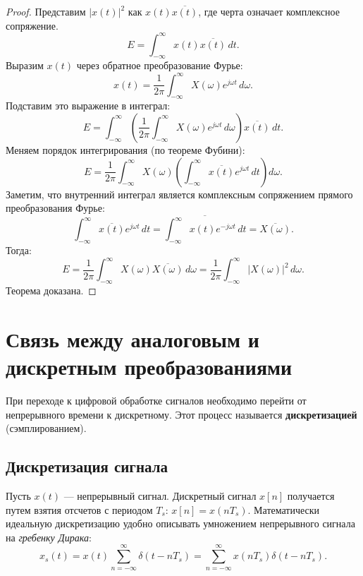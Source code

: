\documentclass[12pt,a4paper]{article}
\theoremstyle{definition}
\begin{document}
\begin{proof}
Представим $|x(t)|^2$ как $x(t)\overline{x(t)}$, где черта означает комплексное сопряжение.
$$ E = \int_{-\infty}^{\infty} x(t) \overline{x(t)} \, dt. $$
Выразим $x(t)$ через обратное преобразование Фурье:
$$ x(t) = \frac{1}{2\pi} \int_{-\infty}^{\infty} X(\omega) e^{j\omega t} \, d\omega. $$
Подставим это выражение в интеграл:
$$ E = \int_{-\infty}^{\infty} \left( \frac{1}{2\pi} \int_{-\infty}^{\infty} X(\omega) e^{j\omega t} \, d\omega \right) \overline{x(t)} \, dt. $$
Меняем порядок интегрирования (по теореме Фубини):
$$ E = \frac{1}{2\pi} \int_{-\infty}^{\infty} X(\omega) \left( \int_{-\infty}^{\infty} \overline{x(t)} e^{j\omega t} \, dt \right) d\omega. $$
Заметим, что внутренний интеграл является комплексным сопряжением прямого преобразования Фурье:
$$ \int_{-\infty}^{\infty} \overline{x(t)} e^{j\omega t} \, dt = \overline{\int_{-\infty}^{\infty} x(t) e^{-j\omega t} \, dt} = \overline{X(\omega)}. $$
Тогда:
$$ E = \frac{1}{2\pi} \int_{-\infty}^{\infty} X(\omega) \overline{X(\omega)} \, d\omega = \frac{1}{2\pi} \int_{-\infty}^{\infty} |X(\omega)|^2 \, d\omega. $$
Теорема доказана.
\end{proof}

\section{Связь между аналоговым и дискретным преобразованиями}

При переходе к цифровой обработке сигналов необходимо перейти от непрерывного времени к дискретному. Этот процесс называется \textbf{дискретизацией} (сэмплированием).

\subsection{Дискретизация сигнала}
Пусть $x(t)$ — непрерывный сигнал. Дискретный сигнал $x[n]$ получается путем взятия отсчетов с периодом $T_s$:
$ x[n] = x(nT_s). $
Математически идеальную дискретизацию удобно описывать умножением непрерывного сигнала на \textit{гребенку Дирака}:
$$ x_s(t) = x(t) \sum_{n=-\infty}^{\infty} \delta(t - nT_s) = \sum_{n=-\infty}^{\infty} x(nT_s) \delta(t - nT_s). $$
\end{document}
